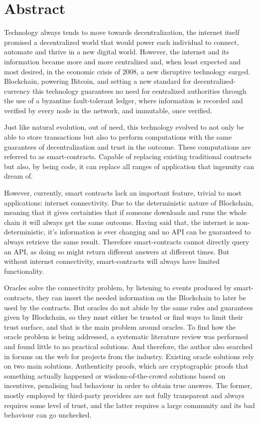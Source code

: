 \chapter*{Abstract}


Technology always tends to move towards decentralization, the internet itself promised a decentralized world that would power each individual to connect, automate and thrive in a new digital world. However, the internet and its information became more and more centralized and, when least expected and most desired, in the economic crisis of 2008, a new disruptive technology surged. Blockchain, powering Bitcoin, and setting a new standard for decentralized-currency this technology guarantees no need for centralized authorities through the use of a byzantine fault-tolerant ledger, where information is recorded and verified by every node in the network, and immutable, once verified.

Just like natural evolution, out of need, this technology evolved to not only be able to store transactions but also to perform computations with the same guarantees of decentralization and trust in the outcome. These computations are referred to as smart-contracts. Capable of replacing existing traditional contracts but also, by being code, it can replace all ranges of application that ingenuity can dream of.

However, currently, smart contracts lack an important feature, trivial to most applications: internet connectivity. Due to the deterministic nature of Blockchain, meaning that it gives certainties that if someone downloads and runs the whole chain it will always get the same outcome. Having said that, the internet is non-deterministic, it's information is ever changing and no API can be guaranteed to always retrieve the same result. Therefore smart-contracts cannot directly query an API, as doing so might return different answers at different times. But without internet connectivity, smart-contracts will always have limited functionality.

Oracles solve the connectivity problem, by listening to events produced by smart-contracts, they can insert the needed information on the Blockchain to later be used by the contracts. But oracles do not abide by the same rules and guarantees given by Blockchain, so they must either be trusted or find ways to limit their trust surface, and that is the main problem around oracles. To find how the oracle problem is being addressed, a systematic literature review was performed and found little to no practical solutions. And therefore, the author also searched in forums on the web for projects from the industry. Existing oracle solutions rely on two main solutions. Authenticity proofs, which are cryptographic proofs that something actually happened or wisdom-of-the-crowd solutions based on incentives, penalising bad behaviour in order to obtain true answers. The former, mostly employed by third-party providers are not fully transparent and always requires some level of trust, and the latter requires a large community and its bad behaviour can go unchecked.

